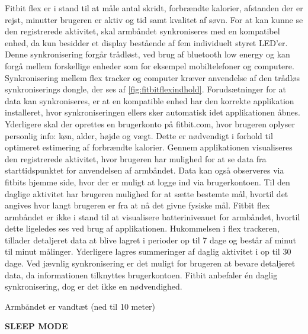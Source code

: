 Fitbit flex er i stand til at måle antal skridt, forbrændte kalorier, afstanden der er rejst, minutter brugeren er aktiv og tid samt kvalitet af søvn. 
For at kan kunne se den registrerede aktivitet, skal armbåndet synkroniseres med en kompatibel enhed, da kun besidder et display bestående af fem individuelt styret LED'er.  
Denne synkronisering forgår trådløst, ved brug af bluetooth low energy og kan forgå mellem forskellige enheder som for eksempel mobiltelefoner og computere. 
Synkronisering mellem flex tracker og computer kræver anvendelse af den trådløs synkroniserings dongle, der ses af \autoref{fig:fitbitflexindhold}.
Forudsætninger for at data kan synkroniseres, er at en kompatible enhed har den korrekte applikation installeret, hvor synkroniseringen ellers sker automatisk idet applikationen åbnes.  
Yderligere skal der oprettes en brugerkonto på fitbit.com, hvor brugeren oplyser personlig info: køn, alder, højde og vægt. Dette er nødvendigt i forhold til optimeret estimering af forbrændte kalorier.  
Gennem applikationen visualiseres den registrerede aktivitet, hvor brugeren har mulighed for at se data fra starttidspunktet for anvendelsen af armbåndet. Data kan også observeres via  fitbits hjemme side, hvor der er muligt at logge ind via brugerkontoen. 
Til den daglige aktivitet har brugeren mulighed for at sætte bestemte mål, hvortil det angives hvor langt brugeren er fra at nå det givne fysiske mål.
Fitbit flex armbåndet er ikke i stand til at visualisere batteriniveauet for armbåndet, hvortil dette ligeledes ses ved brug af applikationen. 
Hukommelsen i flex trackeren, tillader detaljeret data at blive lagret i perioder op til 7 dage og består af minut til minut målinger. 
Yderligere lagres summeringer af daglig aktivitet i op til 30 dage.
Ved jævnlig synkronisering er det muligt for brugeren at bevare detaljeret data, da informationen tilknyttes brugerkontoen. 
Fitbit anbefaler én daglig synkronisering, dog er det ikke en nødvendighed. 

Armbåndet er vandtæt (ned til 10 meter)

\textbf{SLEEP MODE}


